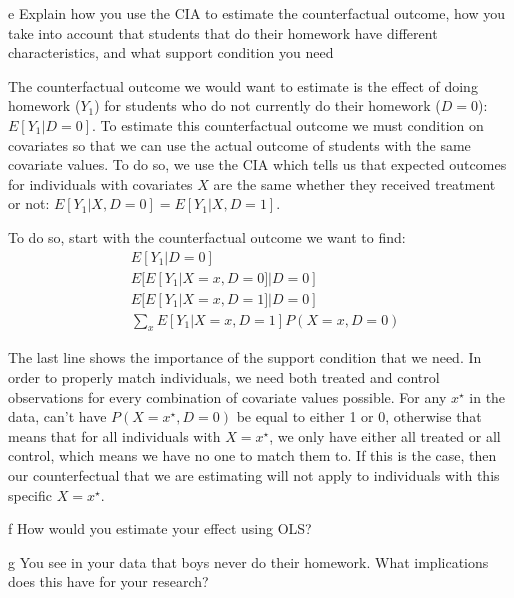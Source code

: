 \documentclass{article}
\begin{document}
\begin{problem}{e}
Explain how you use the CIA to estimate the counterfactual outcome, how you take into account that students that do their homework have different characteristics, and what support condition you need
\end{problem}
\begin{solution}
The counterfactual outcome we would want to estimate is the effect of doing homework ($Y_1$) for students who do not currently do their homework ($D=0$): $E[Y_1|D=0]$. To estimate this counterfactual outcome we must condition on covariates so that we can use the actual outcome of students with the same covariate values. To do so, we use the CIA which tells us that expected outcomes for individuals with covariates $X$ are the same whether they received treatment or not: $E[Y_1|X,D=0]=E[Y_1|X,D=1]$.

To do so, start with the counterfactual outcome we want to find:
\begin{align}
    &E[Y_1|D=0] \tag{Counterfactual outcome} \\
    &E[ E[Y_1| X=x, D=0] | D=0] \tag{Expand inside using LIE} \\
    &E[ E[Y_1| X=x, D=1] | D=0] \tag{Use CIA} \\
    & \sum_{x} E[Y_1 | X=x, D=1] P(X=x,D=0) \tag{Outer E[] as weighted sum}
\end{align}

The last line shows the importance of the support condition that we need. In order to properly match individuals, we need both treated and control observations for every combination of covariate values possible. For any $x^\star$ in the data, can't have $P(X=x^\star,D=0)$ be equal to either 1 or 0, otherwise that means that for all individuals with $X=x^\star$, we only have either all treated or all control, which means we have no one to match them to. If this is the case, then our counterfectual that we are estimating will not apply to individuals with this specific $X=x^\star$.

\end{solution}

\begin{problem}{f}
How would you estimate your effect using OLS?
\end{problem}
\begin{solution}
\end{solution}


\begin{problem}{g}
You see in your data that boys never do their homework. What implications does this have for your research?
\end{problem}
\begin{solution}
\end{solution}
\end{document}
